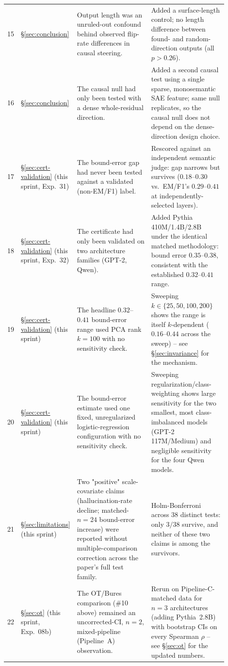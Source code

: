 \documentclass[onecolumn]{jmlr}
\begin{document}
\begin{longtable}{p{0.04\linewidth}p{0.16\linewidth}p{0.35\linewidth}p{0.35\linewidth}}
15 & \S\ref{sec:conclusion} & Output length was an unruled-out confound behind observed flip-rate differences in causal steering. & Added a surface-length control; no length difference between found- and random-direction outputs (all $p>0.26$). \\
16 & \S\ref{sec:conclusion} & The causal null had only been tested with a dense whole-residual direction. & Added a second causal test using a single sparse, monosemantic SAE feature; same null replicates, so the causal null does not depend on the dense-direction design choice. \\
17 & \S\ref{sec:cert-validation} (this sprint, Exp.~31) & The bound-error gap had never been tested against a validated (non-EM/F1) label. & Rescored against an independent semantic judge: gap narrows but survives ($0.18$--$0.30$ vs.\ EM/F1's $0.29$--$0.41$ at independently-selected layers). \\
18 & \S\ref{sec:cert-validation} (this sprint, Exp.~32) & The certificate had only been validated on two architecture families (GPT-2, Qwen). & Added Pythia 410M/1.4B/2.8B under the identical matched methodology: bound error $0.35$--$0.38$, consistent with the established $0.32$--$0.41$ range. \\
19 & \S\ref{sec:cert-validation} (this sprint) & The headline $0.32$--$0.41$ bound-error range used PCA rank $k{=}100$ with no sensitivity check. & Sweeping $k\in\{25,50,100,200\}$ shows the range is itself $k$-dependent ($0.16$--$0.44$ across the sweep) -- see \S\ref{sec:invariance} for the mechanism. \\
20 & \S\ref{sec:cert-validation} (this sprint) & The bound-error estimate used one fixed, unregularized logistic-regression configuration with no sensitivity check. & Sweeping regularization/class-weighting shows large sensitivity for the two smallest, most class-imbalanced models (GPT-2 117M/Medium) and negligible sensitivity for the four Qwen models. \\
21 & \S\ref{sec:limitations} (this sprint) & Two "positive" scale-covariate claims (hallucination-rate decline; matched-$n{=}24$ bound-error increase) were reported without multiple-comparison correction across the paper's full test family. & Holm-Bonferroni across 38 distinct tests: only $3/38$ survive, and neither of these two claims is among the survivors. \\
22 & \S\ref{sec:ot} (this sprint, Exp.~08b) & The OT/Bures comparison (\#10 above) remained an uncorrected-CI, $n{=}2$, mixed-pipeline (Pipeline~A) observation. & Rerun on Pipeline-C-matched data for $n{=}3$ architectures (adding Pythia~2.8B) with bootstrap CIs on every Spearman $\rho$ -- see \S\ref{sec:ot} for the updated numbers. \\

\end{longtable}
\end{document}
